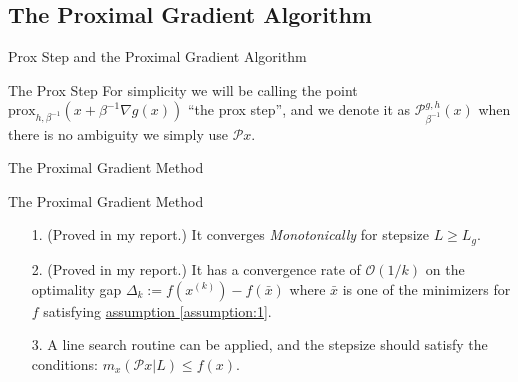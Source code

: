 \documentclass[11pt]{beamer}
\begin{document}
    \subsection{The Proximal Gradient Algorithm}
        \begin{frame}{Prox Step and the Proximal Gradient Algorithm}
            \begin{block}{The Prox Step}
                For simplicity we will be calling the point $\text{prox}_{h, \beta^{-1}}(x + \beta^{-1}\nabla g(x))$ ``the prox step'', and we denote it as $\mathcal P_{\beta^{-1}}^{g, h}(x)$ when there is no ambiguity we simply use $\mathcal Px$.     
            \end{block}
            \begin{block}{The Proximal Gradient Method}
                \begin{algorithm}[H]
                    \scriptsize
                    \begin{algorithmic}[1]
                        \ENDIF
                    \ENDFOR
                    \end{algorithmic}
                    \caption{Proximal Gradient With Fixed Step-sizes}
                    \label{alg:1}
                \end{algorithm}
            \end{block}
        \end{frame}
        \begin{frame}{The Proximal Gradient Method}
            \begin{itemize}
                \item [1.] (Proved in my report.) It converges \emph{Monotonically} for stepsize $L \ge L_g$. 
                \pause \item [2.] (Proved in my report.) It has a convergence rate of $\mathcal O(1/k)$ on the optimality gap $\Delta_k := f(x^{(k)}) - f(\bar x)$ where $\bar x$ is one of the minimizers for $f$ satisfying \hyperref[assumption:1]{assumption \ref*{assumption:1}}. 
                \pause \item [3.] A line search routine can be applied, and the stepsize should satisfy the conditions: $m_x(\mathcal Px|L)\le f(x)$. 
            \end{itemize}
        \end{frame}
        
\end{document}
